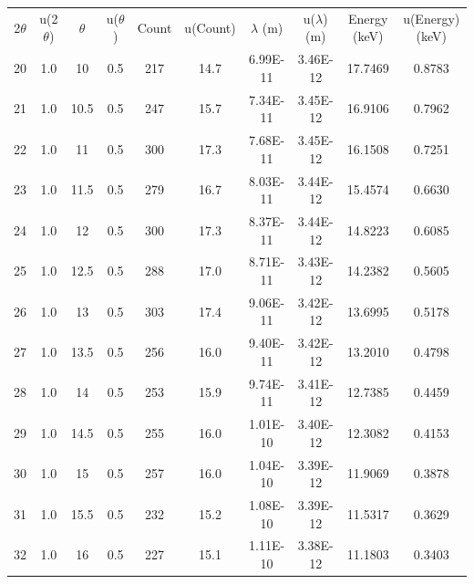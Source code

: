 \documentclass[justified]{tufte-book}
\begin{document}
\begin{table}[ht]
\center
\begin{tabular}{cccccccccc}
\multicolumn{1}{c}{2$\theta$} & \multicolumn{1}{c}{u(2$\theta$)} & \multicolumn{1}{c}{$\theta$} & \multicolumn{1}{c}{u($\theta$)} & \multicolumn{1}{c}{Count} & \multicolumn{1}{c}{u(Count)} & \multicolumn{1}{c}{$\lambda$ (m)} & \multicolumn{1}{c}{u($\lambda$) (m)} & \multicolumn{1}{c}{Energy (keV)} & \multicolumn{1}{c}{u(Energy) (keV)} \\
20          & 1.0   & 10         & 0.5           & 217     & 14.7       & 6.99E-11    & 3.46E-12       & 17.7469   & 0.8783       \\
21          & 1.0   & 10.5       & 0.5           & 247     & 15.7       & 7.34E-11    & 3.45E-12       & 16.9106   & 0.7962       \\
22          & 1.0   & 11         & 0.5           & 300     & 17.3       & 7.68E-11    & 3.45E-12       & 16.1508   & 0.7251       \\
23          & 1.0   & 11.5       & 0.5           & 279     & 16.7       & 8.03E-11    & 3.44E-12       & 15.4574   & 0.6630       \\
24          & 1.0   & 12         & 0.5           & 300     & 17.3       & 8.37E-11    & 3.44E-12       & 14.8223   & 0.6085       \\
25          & 1.0   & 12.5       & 0.5           & 288     & 17.0       & 8.71E-11    & 3.43E-12       & 14.2382   & 0.5605       \\
26          & 1.0   & 13         & 0.5           & 303     & 17.4       & 9.06E-11    & 3.42E-12       & 13.6995   & 0.5178       \\
27          & 1.0   & 13.5       & 0.5           & 256     & 16.0       & 9.40E-11    & 3.42E-12       & 13.2010   & 0.4798       \\
28          & 1.0   & 14         & 0.5           & 253     & 15.9       & 9.74E-11    & 3.41E-12       & 12.7385   & 0.4459       \\
29          & 1.0   & 14.5       & 0.5           & 255     & 16.0       & 1.01E-10    & 3.40E-12       & 12.3082   & 0.4153       \\
30          & 1.0   & 15         & 0.5           & 257     & 16.0       & 1.04E-10    & 3.39E-12       & 11.9069   & 0.3878       \\
31          & 1.0   & 15.5       & 0.5           & 232     & 15.2       & 1.08E-10    & 3.39E-12       & 11.5317   & 0.3629       \\
32          & 1.0   & 16         & 0.5           & 227     & 15.1       & 1.11E-10    & 3.38E-12       & 11.1803   & 0.3403       \\

\end{tabular}
\end{table}
\end{document}
